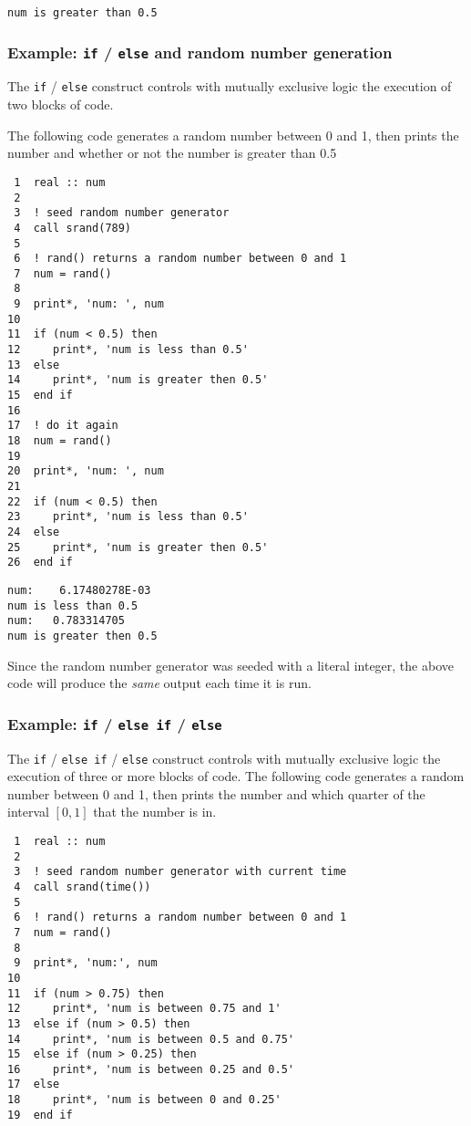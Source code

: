 \documentclass[11pt]{article}
\begin{document}
\begin{verbatim}
num is greater than 0.5
\end{verbatim}

\subsubsection{Example: \texttt{if} / \texttt{else} and random number generation}
\label{sec:orgheadline25}
The \texttt{if} / \texttt{else} construct controls with mutually exclusive logic the execution of two blocks of code.

The following code generates a random number between 0 and 1, then prints the number and whether or not the number is greater than 0.5

\begin{verbatim}
 1  real :: num
 2  
 3  ! seed random number generator
 4  call srand(789)
 5  
 6  ! rand() returns a random number between 0 and 1
 7  num = rand()
 8  
 9  print*, 'num: ', num
10  
11  if (num < 0.5) then
12     print*, 'num is less than 0.5'
13  else
14     print*, 'num is greater then 0.5'
15  end if
16  
17  ! do it again
18  num = rand()
19  
20  print*, 'num: ', num
21  
22  if (num < 0.5) then
23     print*, 'num is less than 0.5'
24  else
25     print*, 'num is greater then 0.5'
26  end if
\end{verbatim}

\begin{verbatim}
num:    6.17480278E-03
num is less than 0.5
num:   0.783314705    
num is greater then 0.5
\end{verbatim}

Since the random number generator was seeded with a literal integer, the above code will produce the \emph{same} output each time it is run.

\subsubsection{Example: \texttt{if} / \texttt{else if} / \texttt{else}}
\label{sec:orgheadline26}
The \texttt{if} / \texttt{else if} / \texttt{else} construct controls with mutually exclusive logic the execution of three or more blocks of code. The following code generates a random number between 0 and 1, then prints the number and which quarter of the interval \([0,1]\) that the number is in.

\begin{verbatim}
 1  real :: num
 2  
 3  ! seed random number generator with current time
 4  call srand(time())
 5  
 6  ! rand() returns a random number between 0 and 1
 7  num = rand()
 8  
 9  print*, 'num:', num
10  
11  if (num > 0.75) then
12     print*, 'num is between 0.75 and 1'
13  else if (num > 0.5) then
14     print*, 'num is between 0.5 and 0.75'
15  else if (num > 0.25) then
16     print*, 'num is between 0.25 and 0.5'
17  else
18     print*, 'num is between 0 and 0.25'
19  end if
\end{verbatim}
\end{document}
